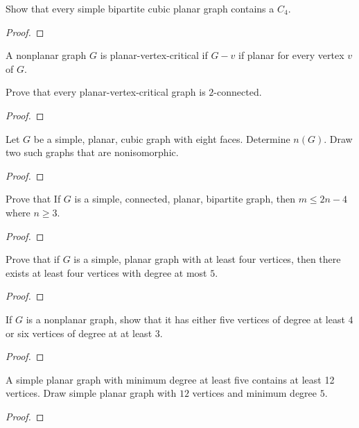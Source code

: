 \begin{exercise}
	Show that every simple bipartite cubic planar graph contains a $C_4$.
\end{exercise}
\begin{proof}
\end{proof}

\begin{definition}
	A nonplanar graph $G$ is planar-vertex-critical if $G-v$ if planar for every vertex $v$ of $G$.
\end{definition}

\begin{exercise}
	Prove that every planar-vertex-critical graph is $2$-connected.
\end{exercise}
\begin{proof}
\end{proof}

\begin{exercise}
	Let $G$ be a simple, planar, cubic graph with eight faces. Determine $n(G)$. Draw two such graphs that are nonisomorphic.
\end{exercise}
\begin{proof}
\end{proof}

\begin{exercise}
	Prove that If $G$ is a simple, connected, planar, bipartite graph, then $m \le 2n-4$ where $n \ge 3$.
\end{exercise}
\begin{proof}
\end{proof}

\begin{exercise}
	Prove that if $G$ is a simple, planar graph with at least four vertices, then there exists at least four vertices with degree at most $5$.
\end{exercise}
\begin{proof}
\end{proof}

\begin{exercise}
	If $G$ is a nonplanar graph, show that it has either five vertices of degree at least $4$ or six vertices of degree at at least $3$.
\end{exercise}
\begin{proof}
\end{proof}

\begin{exercise}
	A simple planar graph with minimum degree at least five contains at least 12 vertices. Draw simple planar graph with $12$ vertices and minimum degree $5$.
\end{exercise}
\begin{proof}
\end{proof}

